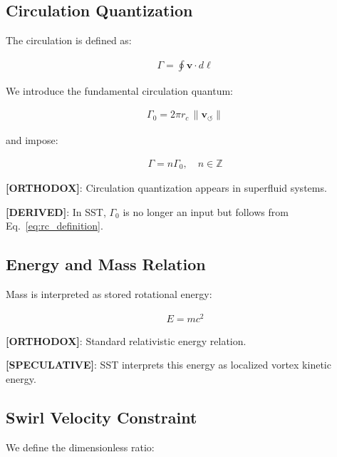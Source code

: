 \documentclass[11pt]{article}
\theoremstyle{definition}
\theoremstyle{plain}
\theoremstyle{remark}
\newcommand{\rc}{{r_c}}
\newcommand{\vnorm}{\lVert \mathbf{v}_{\!\boldsymbol{\circlearrowleft}} \rVert}
\begin{document}
    \subsection{Circulation Quantization}
        
        The circulation is defined as:
        
        \begin{align}
            \Gamma = \oint \mathbf{v} \cdot d\ell
        \end{align}
        
        We introduce the fundamental circulation quantum:
        
        \begin{align}
            \Gamma_0 = 2\pi \rc \, \vnorm
            \label{eq:gamma0}
        \end{align}
        
        and impose:
        
        \begin{align}
            \Gamma = n \Gamma_0, \quad n \in \mathbb{Z}
        \end{align}
        
        \textbf{[ORTHODOX]}: Circulation quantization appears in superfluid systems.
        
        \textbf{[DERIVED]}: In SST, $\Gamma_0$ is no longer an input but follows from Eq.~\ref{eq:rc_definition}.
    
    \subsection{Energy and Mass Relation}
        
        Mass is interpreted as stored rotational energy:
        
        \begin{align}
            E = m c^2
        \end{align}
        
        \textbf{[ORTHODOX]}: Standard relativistic energy relation.
        
        \textbf{[SPECULATIVE]}: SST interprets this energy as localized vortex kinetic energy.
    
    \subsection{Swirl Velocity Constraint}
        
        We define the dimensionless ratio:
        
\end{document}
